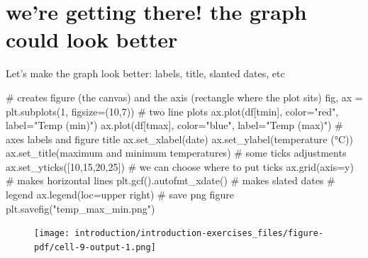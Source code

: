 \documentclass[
  letterpaper,
  DIV=11,
  numbers=noendperiod]{scrreprt}
\newenvironment{Shaded}{\begin{snugshade}}{\end{snugshade}}
\newcommand{\CommentTok}[1]{\textcolor[rgb]{0.37,0.37,0.37}{#1}}
\newcommand{\DecValTok}[1]{\textcolor[rgb]{0.68,0.00,0.00}{#1}}
\newcommand{\NormalTok}[1]{\textcolor[rgb]{0.00,0.23,0.31}{#1}}
\newcommand{\OperatorTok}[1]{\textcolor[rgb]{0.37,0.37,0.37}{#1}}
\newcommand{\StringTok}[1]{\textcolor[rgb]{0.13,0.47,0.30}{#1}}
\begin{document}
\hypertarget{were-getting-there-the-graph-could-look-better}{%
\section{we're getting there! the graph could look
better}\label{were-getting-there-the-graph-could-look-better}}

Let's make the graph look better: labels, title, slanted dates, etc

\begin{Shaded}
\begin{Highlighting}[]
\CommentTok{\# creates figure (the canvas) and the axis (rectangle where the plot sits)}
\NormalTok{fig, ax }\OperatorTok{=}\NormalTok{ plt.subplots(}\DecValTok{1}\NormalTok{, figsize}\OperatorTok{=}\NormalTok{(}\DecValTok{10}\NormalTok{,}\DecValTok{7}\NormalTok{))}
\CommentTok{\# two line plots}
\NormalTok{ax.plot(df[}\StringTok{\textquotesingle{}tmin\textquotesingle{}}\NormalTok{], color}\OperatorTok{=}\StringTok{"red"}\NormalTok{, label}\OperatorTok{=}\StringTok{"Temp (min)"}\NormalTok{)}
\NormalTok{ax.plot(df[}\StringTok{\textquotesingle{}tmax\textquotesingle{}}\NormalTok{], color}\OperatorTok{=}\StringTok{"blue"}\NormalTok{, label}\OperatorTok{=}\StringTok{"Temp (max)"}\NormalTok{)}
\CommentTok{\# axes labels and figure title}
\NormalTok{ax.set\_xlabel(}\StringTok{\textquotesingle{}date\textquotesingle{}}\NormalTok{)}
\NormalTok{ax.set\_ylabel(}\StringTok{\textquotesingle{}temperature (°C)\textquotesingle{}}\NormalTok{)}
\NormalTok{ax.set\_title(}\StringTok{\textquotesingle{}maximum and minimum temperatures\textquotesingle{}}\NormalTok{)}
\CommentTok{\# some ticks adjustments}
\NormalTok{ax.set\_yticks([}\DecValTok{10}\NormalTok{,}\DecValTok{15}\NormalTok{,}\DecValTok{20}\NormalTok{,}\DecValTok{25}\NormalTok{])  }\CommentTok{\# we can choose where to put ticks}
\NormalTok{ax.grid(axis}\OperatorTok{=}\StringTok{\textquotesingle{}y\textquotesingle{}}\NormalTok{)         }\CommentTok{\# makes horizontal lines}
\NormalTok{plt.gcf().autofmt\_xdate()  }\CommentTok{\# makes slated dates}
\CommentTok{\# legend}
\NormalTok{ax.legend(loc}\OperatorTok{=}\StringTok{\textquotesingle{}upper right\textquotesingle{}}\NormalTok{)}
\CommentTok{\# save png figure}
\NormalTok{plt.savefig(}\StringTok{"temp\_max\_min.png"}\NormalTok{)}
\end{Highlighting}
\end{Shaded}

\begin{figure}[H]

{\centering \texttt{[image: introduction/introduction-exercises\_files/figure-pdf/cell-9-output-1.png]}

}

\end{figure}
\end{document}

